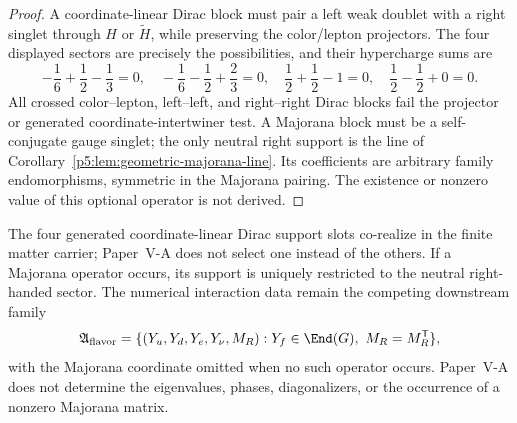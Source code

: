 \documentclass[12pt,a4paper]{article}
\begin{document}
\begin{proof}
A coordinate-linear Dirac block must pair a left weak doublet with a right
singlet through \(H\) or \(\widetilde H\), while preserving the color/lepton
projectors.  The four displayed sectors are precisely the possibilities, and
their hypercharge sums are
\[
-\frac16+\frac12-\frac13=0,
\quad
-\frac16-\frac12+\frac23=0,
\quad
\frac12+\frac12-1=0,
\quad
\frac12-\frac12+0=0.
\]
All crossed color--lepton, left--left, and right--right Dirac blocks fail the
projector or generated coordinate-intertwiner test.  A Majorana block must be
a self-conjugate gauge singlet; the only neutral right support is the line of
Corollary~\ref{p5:lem:geometric-majorana-line}.  Its coefficients are
arbitrary family endomorphisms, symmetric in the Majorana pairing.  The
existence or nonzero value of this optional operator is not derived.
\end{proof}

\begin{corollary}
\label{p5:cor:yukawa-matrices-interface-data}
The four generated coordinate-linear Dirac support slots co-realize in the
finite matter carrier; Paper~V-A does not select one instead of the others.  If
a Majorana operator occurs, its support is uniquely restricted to the neutral
right-handed sector.  The numerical interaction data remain the competing
downstream family
\[
\mathfrak A_{\rm flavor}
=
\{(Y_u,Y_d,Y_e,Y_\nu,M_R):
Y_f\in\End(G),\ M_R=M_R^{\mathsf T}\},
\]
with the Majorana coordinate omitted when no such operator occurs.  Paper~V-A
does not determine the eigenvalues, phases, diagonalizers, or the occurrence
of a nonzero Majorana matrix.
\end{corollary}
\end{document}
